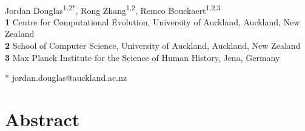 \documentclass[10pt,letterpaper]{article}
\begin{document}
\vspace*{0.2in}

\begin{flushleft}
{\Large
\textbf{} %
}
\newline
\\
Jordan Douglas\textsuperscript{1,2*},
Rong Zhang\textsuperscript{1,2},
Remco Bouckaert\textsuperscript{1,2,3}
\\
\bigskip
\textbf{1} Centre for Computational Evolution,  University of Auckland, Auckland, New Zealand\\
\textbf{2} School of Computer Science, University of Auckland, Auckland, New Zealand\\
\textbf{3} Max Planck Institute for the Science of Human History, Jena, Germany\\
\bigskip


* jordan.douglas@auckland.ac.nz


\end{flushleft}
\section*{Abstract}


\end{document}
